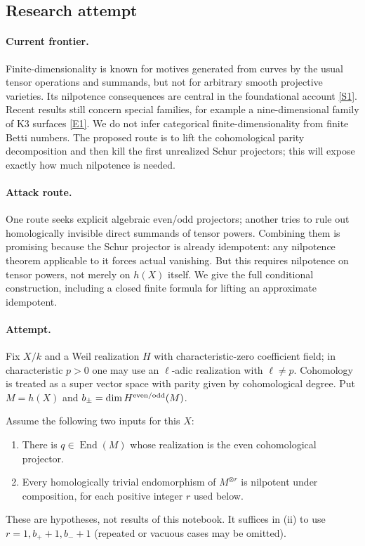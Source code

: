 \documentclass[11pt,a4paper]{article}
\newcommand{\sref}[2]{\hyperlink{source:#1:#2}{[S#2]}}
\newcommand{\eref}[2]{\hyperlink{extra:#1:#2}{[E#2]}}
\numberwithin{equation}{section}
\begin{document}
\subsection{Research attempt}

\paragraph{Current frontier.}
Finite-dimensionality is known for motives generated from curves by the usual tensor operations and summands, but not for arbitrary smooth projective varieties. Its nilpotence consequences are central in the foundational account \sref{191}{1}. Recent results still concern special families, for example a nine-dimensional family of K3 surfaces \eref{191}{1}. We do not infer categorical finite-dimensionality from finite Betti numbers. The proposed route is to lift the cohomological parity decomposition and then kill the first unrealized Schur projectors; this will expose exactly how much nilpotence is needed.

\paragraph{Attack route.}
One route seeks explicit algebraic even/odd projectors; another tries to rule out homologically invisible direct summands of tensor powers. Combining them is promising because the Schur projector is already idempotent: any nilpotence theorem applicable to it forces actual vanishing. But this requires nilpotence on tensor powers, not merely on $h(X)$ itself. We give the full conditional construction, including a closed finite formula for lifting an approximate idempotent.

\paragraph{Attempt.}
Fix $X/k$ and a Weil realization $H$ with characteristic-zero coefficient field; in characteristic $p>0$ one may use an $\ell$-adic realization with $\ell\ne p$. Cohomology is treated as a super vector space with parity given by cohomological degree. Put $M=h(X)$ and $b_\pm=\dim H^{\rm even/odd}(M)$.

Assume the following two inputs for this $X$:
\begin{enumerate}[label=(\roman*),leftmargin=2.5em]
\item There is $q\in\operatorname{End}(M)$ whose realization is the even cohomological projector.
\item Every homologically trivial endomorphism of $M^{\otimes r}$ is nilpotent under composition, for each positive integer $r$ used below.
\end{enumerate}
These are hypotheses, not results of this notebook. It suffices in (ii) to use $r=1,b_++1,b_-+1$ (repeated or vacuous cases may be omitted).
\end{document}
